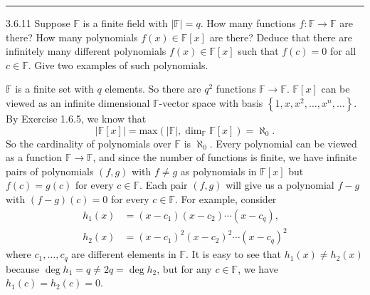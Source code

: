 \documentclass[a4paper, 12pt]{article}
\begin{document}
\noindent\rule{7in}{2.8pt}
\begin{problem}{3.6.11}
Suppose \(\mathbb{F}\) is a finite field with \(|\mathbb{F}|=q\). How many functions \(f:\mathbb{F}\rightarrow \mathbb{F}\) are there? How many polynomials \(f(x)\in \mathbb{F}[x]\) are there? Deduce that 
there are infinitely many different polynomials \(f(x)\in \mathbb{F}[x]\) such that \(f(c)=0\) for all \(c\in \mathbb{F}\). Give two examples of such polynomials.
\end{problem}
\begin{solution}
\(\mathbb{F}\) is a finite set with \(q\) elements. So there are \(q^2\) functions \(\mathbb{F}\rightarrow \mathbb{F}\). \(\mathbb{F}[x]\) can be viewed as an infinite dimensional \(\mathbb{F}\)-vector space with basis 
\(\left\{ 1,x,x^2,\ldots,x^n,\ldots \right\}\). By Exercise 1.6.5, we know that 
\[|\mathbb{F}[x]|=\text{max}(|\mathbb{F}|,\dim_{\mathbb{F}}\mathbb{F}[x])=\aleph_0.\]
So the cardinality of polynomials over \(\mathbb{F}\) is \(\aleph_0\). Every polynomial can be viewed as a function \(\mathbb{F}\rightarrow \mathbb{F}\), and since the number of functions is finite, we have infinite pairs of polynomials 
\((f,g)\) with \(f\neq g\) as polynomials in \(\mathbb{F}[x]\) but \(f(c)=g(c)\) for every \(c\in \mathbb{F}\). Each pair \((f,g)\) will give us a polynomial \(f-g\) with \((f-g)(c)=0\) for every \(c\in \mathbb{F}\). For example, consider 
\begin{align*}
    h_1(x)&=(x-c_1)(x-c_2)\cdots(x-c_q),\\
    h_2(x)&=(x-c_1)^2(x-c_2)^2\cdots(x-c_q)^2
\end{align*}
where \(c_1,\ldots,c_q\) are different elements in \(\mathbb{F}\). It is easy to see that \(h_1(x)\neq h_2(x)\) because \(\deg h_1=q\neq 2q=\deg h_2\), but for any \(c\in \mathbb{F}\), we have \(h_1(c)=h_2(c)=0\).
\end{solution}
\end{document}
